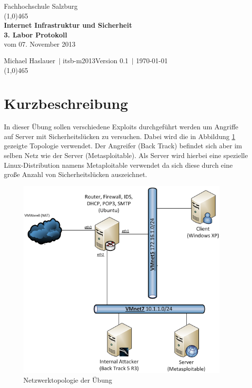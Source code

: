 \documentclass[a4paper,12pt]{article} %
\author{\theauthor\\\company}
\date{\thedate}
\title{\thetitle}
\def \theauthor  {Michael Haslauer}
\def \thedate    {\today}
\def \thetitle   {Internet Infrastruktur und Sicherheit\\3. Labor Protokoll}
\def \subtitle   {vom 07. November 2013}
\def \company    {Fachhochschule Salzburg}
\def \department {itsb-m2013}
\def \version    {0.1}
\begin{document}
\begin{titlepage}
\begin{center}
\Large\company\tiny\\
\textcolor{titlepagelinecolor}{\line(1,0){465}\\[1cm]}
\huge
\textbf{\thetitle}\\
\Large \subtitle\\[1cm]
\end{center}
\large
\theauthor\ $\mid$ \department\hfill Version \version\ $\mid$ \thedate\\[1cm]
\textcolor{titlepagelinecolor}{\line(1,0){465}\\[1cm]}
\end{titlepage}

\tableofcontents %

\newpage

\section{Kurzbeschreibung}
In dieser Übung sollen verschiedene Exploits durchgeführt werden um Angriffe auf Server mit Sicherheitslücken zu versuchen. Dabei wird die in Abbildung \ref{fig:topologie} gezeigte Topologie verwendet. Der Angreifer (Back Track) befindet sich aber im selben Netz wie der Server (Metasploitable). Als Server wird hierbei eine spezielle Linux-Distribution namens Metaploitable verwendet da sich diese durch eine große Anzahl von Sicherheitslücken auszeichnet.
\begin{figure}[ht]
	\centering
		\includegraphics[width=0.95\textwidth]{img/topologie.png}
	\caption{Netzwerktopologie der Übung}
	\label{fig:topologie}
\end{figure}
\end{document}
